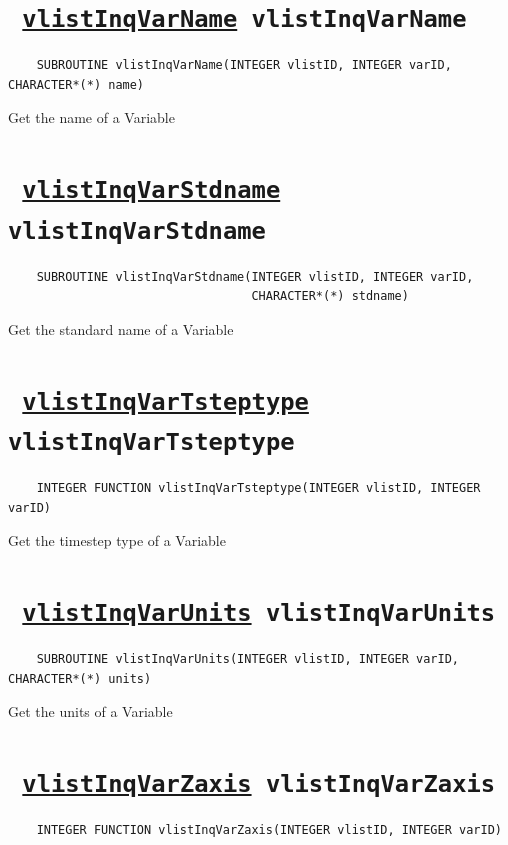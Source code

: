 \section*{\texttt{ 
\ifpdf
\hyperref[vlistInqVarName]{vlistInqVarName}
\else
vlistInqVarName
\fi
}}
\begin{verbatim}
    SUBROUTINE vlistInqVarName(INTEGER vlistID, INTEGER varID, CHARACTER*(*) name)
\end{verbatim}

Get the name of a Variable
\ifpdfoutput{}{(\ref{vlistInqVarName})}


\section*{\texttt{ 
\ifpdf
\hyperref[vlistInqVarStdname]{vlistInqVarStdname}
\else
vlistInqVarStdname
\fi
}}
\begin{verbatim}
    SUBROUTINE vlistInqVarStdname(INTEGER vlistID, INTEGER varID, 
                                  CHARACTER*(*) stdname)
\end{verbatim}

Get the standard name of a Variable
\ifpdfoutput{}{(\ref{vlistInqVarStdname})}


\section*{\texttt{ 
\ifpdf
\hyperref[vlistInqVarTsteptype]{vlistInqVarTsteptype}
\else
vlistInqVarTsteptype
\fi
}}
\begin{verbatim}
    INTEGER FUNCTION vlistInqVarTsteptype(INTEGER vlistID, INTEGER varID)
\end{verbatim}

Get the timestep type of a Variable
\ifpdfoutput{}{(\ref{vlistInqVarTsteptype})}


\section*{\texttt{ 
\ifpdf
\hyperref[vlistInqVarUnits]{vlistInqVarUnits}
\else
vlistInqVarUnits
\fi
}}
\begin{verbatim}
    SUBROUTINE vlistInqVarUnits(INTEGER vlistID, INTEGER varID, CHARACTER*(*) units)
\end{verbatim}

Get the units of a Variable
\ifpdfoutput{}{(\ref{vlistInqVarUnits})}


\section*{\texttt{ 
\ifpdf
\hyperref[vlistInqVarZaxis]{vlistInqVarZaxis}
\else
vlistInqVarZaxis
\fi
}}
\begin{verbatim}
    INTEGER FUNCTION vlistInqVarZaxis(INTEGER vlistID, INTEGER varID)
\end{verbatim}

